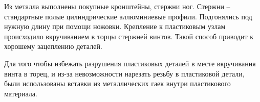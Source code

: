Из металла выполнены покупные кронштейны, стержни ног. Стержни -- стандартные полые цилиндрические аллюминиевые профили. Подгонялись под нужную длину при помощи ножовки. Крепление к пластиковым узлам происходило вкручиванием в торцы стержней винтов. Такой способ приводит к хорошему зацеплению деталей.

Для того чтобы избежать разрушения пластиковых деталей в месте вкручивания винта в торец, и из-за невозможности нарезать резьбу в пластиковой детали, были использованы вставки из металлических гаек внутри пластикового материала.